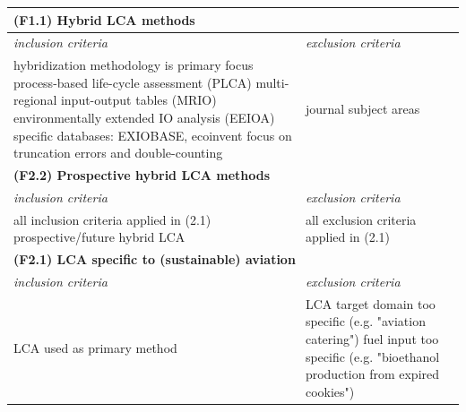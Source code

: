 \documentclass{article}
\begin{document}
        
            \begin{table}[H]
                \centering
                \begin{tabularx}{\textwidth}{| X | X |}
                    \hline
                \multicolumn{2}{|l|}{\textbf{(F1.1) Hybrid LCA methods}}  \\
                    \hline
                    \textit{inclusion criteria} & \textit{exclusion criteria} \\
                    \hline
                        hybridization methodology is primary focus \newline
                        process-based life-cycle assessment (PLCA) \newline
                        multi-regional input-output tables (MRIO) \newline
                        environmentally extended IO analysis (EEIOA) \newline
                        specific databases: EXIOBASE, ecoinvent \newline
                        focus on truncation errors and double-counting
                    &
                        journal subject areas
                    \\
                    \hline
                \multicolumn{2}{|l|}{\textbf{(F2.2) Prospective hybrid LCA methods}}  \\
                    \hline
                    \textit{inclusion criteria} & \textit{exclusion criteria} \\
                    \hline
                        all inclusion criteria applied in (2.1) \newline
                        prospective/future hybrid LCA
                    &
                        all exclusion criteria applied in (2.1)
                    \\
                    \hline
                \multicolumn{2}{|l|}{\textbf{(F2.1) LCA specific to (sustainable) aviation}}  \\
                    \hline
                    \textit{inclusion criteria} & \textit{exclusion criteria} \\
                    \hline
                        LCA used as primary method  \newline
                    &
                        LCA target domain too specific \newline (e.g. "aviation catering") \newline
                        fuel input too specific \newline (e.g. "bioethanol production from expired cookies") \newline

\end{tabularx}
\end{table}
\end{document}
